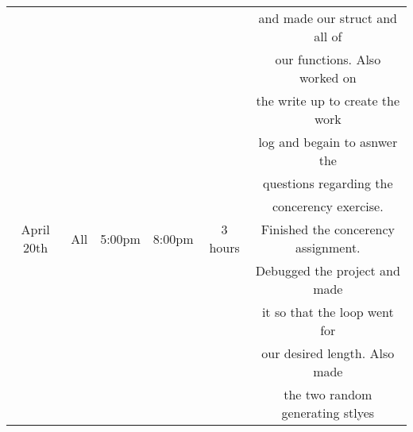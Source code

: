 \begin{center}
\begin{tabular}{ |c|c|c|c|c|c| }
    &  &  &  &  & and made our struct and all of \\
    &  &  &  &  & our functions. Also worked on\\
    &  &  &  &  & the write up to create the work\\
    &  &  &  &  & log and begain to asnwer the\\
    &  &  &  &  & questions regarding the \\
    &  &  &  &  & concerency exercise. \\
   \hline
   April 20th & All & 5:00pm & 8:00pm & 3 hours & Finished the concerency assignment.\\
    &  &  &  &  & Debugged the project and made\\
    &  &  &  &  & it so that the loop went for \\
    &  &  &  &  & our desired length. Also made\\
    &  &  &  &  & the two random generating stlyes\\
   \hline
\end{tabular}
\end{center}


